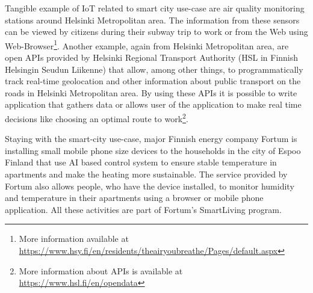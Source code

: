 \documentclass[english, 12pt, a4paper, elec, utf8, online]{aaltothesis}
\begin{document}
Tangible example of IoT related to smart city use-case are air quality monitoring stations around Helsinki Metropolitan area. The information from these sensors can be viewed by citizens during their subway trip to work or from the Web using Web-Browser\footnote{More information available at \url{https://www.hsy.fi/en/residents/theairyoubreathe/Pages/default.aspx}}. Another example, again from Helsinki Metropolitan area, are open APIs provided by Helsinki Regional Transport Authority (HSL in Finnish Helsingin Seudun Liikenne) that allow, among other things, to programmatically track real-time geolocation and other information about public transport on the roads in Helsinki Metropolitan area. By using these APIs it is possible to write application that gathers data or allows user of the application to make real time decisions like choosing an optimal route to work\footnote{More information about APIs is available at \url{https://www.hsl.fi/en/opendata}}.  

Staying with the smart-city use-case, major Finnish energy company Fortum is installing small mobile phone size devices to the households in the city of Espoo Finland that use AI based control system to ensure stable temperature in apartments and make the heating more sustainable. The service provided by Fortum also allows people, who have the device installed, to monitor humidity and temperature in their apartments using a browser or mobile phone application. All these activities are part of Fortum's SmartLiving program.   
\end{document}

